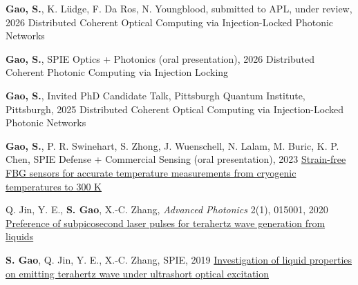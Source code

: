 
\begin{cventries}

  \cventry
    {\textbf{Gao, S.}, K. L\"udge, F. Da Ros, N. Youngblood, submitted to APL, under review, 2026}
    {Distributed Coherent Optical Computing via Injection-Locked Photonic Networks}
    {}{}{}

  \cventry
    {\textbf{Gao, S.}, SPIE Optics + Photonics (oral presentation), 2026}
    {Distributed Coherent Photonic Computing via Injection Locking}
    {}{}{}

  \cventry
    {\textbf{Gao, S.}, Invited PhD Candidate Talk, Pittsburgh Quantum Institute, Pittsburgh, 2025}
    {Distributed Coherent Optical Computing via Injection-Locked Photonic Networks}
    {}{}{}

  \cventry
    {\textbf{Gao, S.}, P. R. Swinehart, S. Zhong, J. Wuenschell, N. Lalam, M. Buric, K. P. Chen, SPIE Defense + Commercial Sensing (oral presentation), 2023}
    {\href{https://www.spiedigitallibrary.org/conference-proceedings-of-spie/12532/125320U/Strain-free-FBG-sensors-for-accurate-temperature-measurements-from-cryogenic/10.1117/12.2670079.short}{Strain-free FBG sensors for accurate temperature measurements from cryogenic temperatures to 300 K}}
    {}{}{}

  \cventry
    {Q. Jin, Y. E., \textbf{S. Gao}, X.-C. Zhang, \textit{Advanced Photonics} 2(1), 015001, 2020}
    {\href{https://www.spiedigitallibrary.org/journals/advanced-photonics/volume-2/issue-1/015001/Preference-of-subpicosecond-laser-pulses-for-terahertz-wave-generation-from/10.1117/1.AP.2.1.015001.short}{Preference of subpicosecond laser pulses for terahertz wave generation from liquids}}
    {}{}{}

  \cventry
    {\textbf{S. Gao}, Q. Jin, Y. E., X.-C. Zhang, SPIE, 2019}
    {\href{https://www.spiedigitallibrary.org/conference-proceedings-of-spie/11196/1119609/Investigation-of-liquid-properties-on-emitting-terahertz-wave-under-ultrashort/10.1117/12.2538433.short}{Investigation of liquid properties on emitting terahertz wave under ultrashort optical excitation}}
    {}{}{}

\end{cventries}
